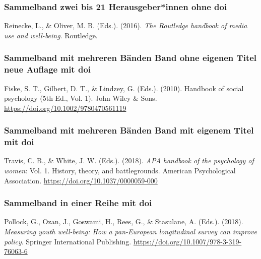 \documentclass[
  letterpaper,
  DIV=11]{scrreprt}
\begin{document}
\hypertarget{sammelband-zwei-bis-21-herausgeberinnen-ohne-doi}{%
\subsubsection{Sammelband \textbar{} zwei bis 21 Herausgeber*innen
\textbar{} ohne
doi}\label{sammelband-zwei-bis-21-herausgeberinnen-ohne-doi}}

Reinecke, L., \& Oliver, M. B. (Eds.). (2016). \emph{The Routledge
handbook of media use and well-being}. Routledge.

\hypertarget{sammelband-mit-mehreren-buxe4nden-band-ohne-eigenen-titel-neue-auflage-mit-doi}{%
\subsubsection{Sammelband mit mehreren Bänden \textbar{} Band ohne
eigenen Titel \textbar{} neue Auflage \textbar{} mit
doi}\label{sammelband-mit-mehreren-buxe4nden-band-ohne-eigenen-titel-neue-auflage-mit-doi}}

Fiske, S. T., Gilbert, D. T., \& Lindzey, G. (Eds.). (2010). Handbook of
social psychology (5th Ed., Vol. 1). John Wiley \& Sons.
\url{https://doi.org/10.1002/9780470561119}

\hypertarget{sammelband-mit-mehreren-buxe4nden-band-mit-eigenem-titel-mit-doi}{%
\subsubsection{Sammelband mit mehreren Bänden \textbar{} Band mit
eigenem Titel \textbar{} mit
doi}\label{sammelband-mit-mehreren-buxe4nden-band-mit-eigenem-titel-mit-doi}}

Travis, C. B., \& White, J. W. (Eds.). (2018). \emph{APA handbook of the
psychology of women}: Vol. 1. History, theory, and battlegrounds.
American Psychological Association.
\url{https://doi.org/10.1037/0000059-000}

\hypertarget{sammelband-in-einer-reihe-mit-doi}{%
\subsubsection{Sammelband in einer Reihe \textbar{} mit
doi}\label{sammelband-in-einer-reihe-mit-doi}}

Pollock, G., Ozan, J., Goswami, H., Rees, G., \& Stasulane, A. (Eds.).
(2018). \emph{Measuring youth well-being: How a pan-European
longitudinal survey can improve policy}. Springer International
Publishing. \url{https://doi.org/10.1007/978-3-319-76063-6}
\end{document}
